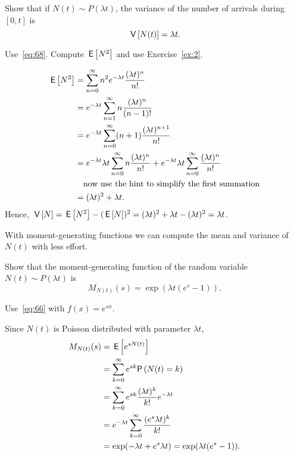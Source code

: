 \begin{exercise}{\faCalculator}
  Show that if $N(t)\sim P(\lambda t)$, the variance of the number of arrivals during $[0,t]$ is
  \begin{equation*}
\,\mathsf{V}\left[N(t)\right] = \lambda t.
  \end{equation*}
  \begin{hint} Use~\eqref{eq:68}. Compute $\,\mathsf{E}\left[N^2\right]$ and use Exercise~\ref{ex:2}.
  \end{hint}
  \begin{solution} 

    \begin{align*}
      \,\mathsf{E}\left[N^2\right]
&= \sum_{n=0}^\infty n^2 e^{-\lambda t}\frac{(\lambda t)^n}{n!}  \\
&= e^{-\lambda t} \sum_{n=1}^\infty n \frac{(\lambda t)^n}{(n-1)!}  \\
&= e^{-\lambda t} \sum_{n=0}^\infty (n+1) \frac{(\lambda t)^{n+1}}{n!}  \\
&= e^{-\lambda t} \lambda t \sum_{n=0}^\infty n \frac{(\lambda t)^{n}}{n!}  +e^{-\lambda t}\lambda t \sum_{n=0}^\infty\frac{(\lambda t)^{n}}{n!}  \\
&\quad\text{now use the hint to simplify the first summation} \\
&= (\lambda t)^2  + \lambda t.
\end{align*}
Hence, $\,\mathsf{V}\left[N\right] = \,\mathsf{E}\left[N^2\right] - (\,\mathsf{E}\left[N\right])^2 = (\lambda t)^2 + \lambda t - (\lambda t)^2 = \lambda t$.
\end{solution}
\end{exercise}

With moment-generating functions we can compute the mean and variance of $N(t)$ with less effort. 
\begin{exercise}{\faCalculator}
Show that the moment-generating function of the random variable~$N(t)\sim P(\lambda t)$ is
\begin{equation*}
M_{N(t)}(s) 
= \exp{(\lambda t(e^s-1))}.
\end{equation*}
\begin{hint}
Use~\eqref{eq:66} with $f(x) = e^{sx}$.  \end{hint}
\begin{solution}
Since $N(t)$ is Poisson distributed with parameter $\lambda t$, 
\begin{align*}
M_{N(t)}(s)
&=  \E{e^{s N(t)}} \\
&= \sum_{k=0}^\infty e^{s k} \P{N(t)=k} \\
&= \sum_{k=0}^\infty e^{s k} \frac{(\lambda t)^k}{k!} e^{-\lambda t}  \\
&= e^{-\lambda t} \sum_{k=0}^\infty  \frac{(e^s \lambda t)^k}{k!}  \\
&= \exp(-\lambda t + e^s \lambda t) =\exp(\lambda t(e^s - 1)).
\end{align*}
\end{solution}
\end{exercise}


